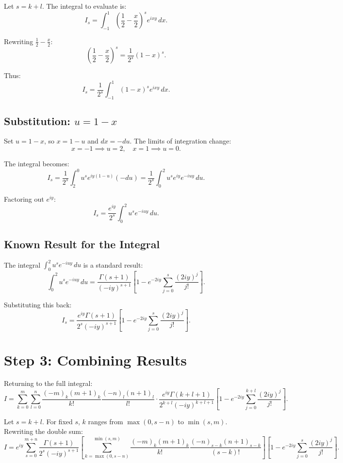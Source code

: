 \documentclass[12pt]{article}
\begin{document}
Let $s = k + l$. The integral to evaluate is:
\[
I_s = \int_{-1}^1 \left(\frac{1}{2} - \frac{x}{2}\right)^s e^{i x y} \, dx.
\]

Rewriting $\frac{1}{2} - \frac{x}{2}$:
\[
\left(\frac{1}{2} - \frac{x}{2}\right)^s = \frac{1}{2^s} (1 - x)^s.
\]

Thus:
\[
I_s = \frac{1}{2^s} \int_{-1}^1 (1 - x)^s e^{i x y} \, dx.
\]

\subsection*{Substitution: $u = 1 - x$}

Set $u = 1 - x$, so $x = 1 - u$ and $dx = -du$. The limits of integration change:
\[
x = -1 \implies u = 2, \quad x = 1 \implies u = 0.
\]

The integral becomes:
\[
I_s = \frac{1}{2^s} \int_2^0 u^s e^{i y (1-u)} (-du) = \frac{1}{2^s} \int_0^2 u^s e^{i y} e^{-i u y} \, du.
\]

Factoring out $e^{i y}$:
\[
I_s = \frac{e^{i y}}{2^s} \int_0^2 u^s e^{-i u y} \, du.
\]

\subsection*{Known Result for the Integral}

The integral $\int_0^2 u^s e^{-i u y} \, du$ is a standard result:
\[
\int_0^2 u^s e^{-i u y} \, du = \frac{\Gamma(s+1)}{(-i y)^{s+1}} 
\left[ 1 - e^{-2 i y} \sum_{j=0}^s \frac{(2 i y)^j}{j!} \right].
\]

Substituting this back:
\[
I_s = \frac{e^{i y} \Gamma(s+1)}{2^s (-i y)^{s+1}} 
\left[ 1 - e^{-2 i y} \sum_{j=0}^s \frac{(2 i y)^j}{j!} \right].
\]

\section*{Step 3: Combining Results}

Returning to the full integral:
\[
I = \sum_{k=0}^m \sum_{l=0}^n \frac{(-m)_k (m+1)_k}{k!} \frac{(-n)_l (n+1)_l}{l!} 
\cdot \frac{e^{i y} \Gamma(k+l+1)}{2^{k+l} (-i y)^{k+l+1}} 
\left[ 1 - e^{-2 i y} \sum_{j=0}^{k+l} \frac{(2 i y)^j}{j!} \right].
\]

Let $s = k + l$. For fixed $s$, $k$ ranges from $\max(0, s-n)$ to $\min(s, m)$. Rewriting the double sum:
\[
I = e^{i y} \sum_{s=0}^{m+n} \frac{\Gamma(s+1)}{2^s (-i y)^{s+1}} 
\left[ \sum_{k=\max(0, s-n)}^{\min(s, m)} \frac{(-m)_k (m+1)_k}{k!} \frac{(-n)_{s-k} (n+1)_{s-k}}{(s-k)!} \right] 
\left[ 1 - e^{-2 i y} \sum_{j=0}^s \frac{(2 i y)^j}{j!} \right].
\]
\end{document}
